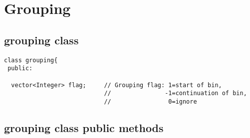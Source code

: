 \documentclass[11pt]{book}
\begin{document}
\section{Grouping}

\subsection{grouping class}

\begin{verbatim}
class grouping{
 public:

  vector<Integer> flag;     // Grouping flag: 1=start of bin, 
                            //               -1=continuation of bin,
                            //                0=ignore
\end{verbatim}

\subsection{grouping class public methods}
\end{document}

